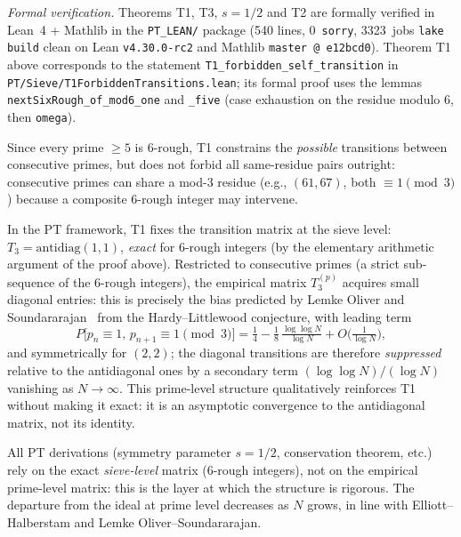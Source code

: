 \documentclass[12pt,a4paper]{article}
\begin{document}
\medskip
\noindent\emph{Formal verification.}
Theorems T1, T3, $s=1/2$ and T2 are formally verified in Lean~4 + Mathlib in
the \texttt{PT\_LEAN/} package (540 lines, 0~\texttt{sorry},
3323~jobs \texttt{lake build} clean on Lean \texttt{v4.30.0-rc2} and
Mathlib \texttt{master @ e12bcd0}). Theorem T1 above corresponds to the
statement \texttt{T1\_forbidden\_self\_transition} in
\texttt{PT/Sieve/T1ForbiddenTransitions.lean}; its formal proof uses the
lemmas \texttt{nextSixRough\_of\_mod6\_one} and \texttt{\_five} (case
exhaustion on the residue modulo 6, then \texttt{omega}).

\begin{corollary}
\label{cor:T1_primes}
Since every prime $\geq 5$ is $6$-rough, T1 constrains the
\emph{possible} transitions between consecutive primes, but does not
forbid all same-residue pairs outright: consecutive primes can share a
mod-$3$ residue (e.g., $(61, 67)$, both $\equiv 1 \pmod{3}$) because a
composite $6$-rough integer may intervene.
\end{corollary}

\begin{remark}
\label{rem:T0_scope}
In the PT framework, T1 fixes the transition matrix at the sieve level:
$T_3 = \mathrm{antidiag}(1,1)$, \emph{exact} for $6$-rough integers
(by the elementary arithmetic argument of the proof above).
Restricted to consecutive primes (a strict sub-sequence of the
$6$-rough integers), the empirical matrix $T_3^{(p)}$ acquires small
diagonal entries: this is precisely the bias predicted by Lemke Oliver
and Soundararajan~\cite{LemkeOliverSoundararajan2016} from the
Hardy--Littlewood conjecture, with leading term
\begin{equation}
  P\bigl[p_n \equiv 1,\, p_{n+1} \equiv 1 \pmod 3\bigr]
   = \tfrac{1}{4} - \tfrac{1}{8}\,\tfrac{\log\log N}{\log N}
     + O\!\bigl(\tfrac{1}{\log N}\bigr),
  \label{eq:LOS_diag}
\end{equation}
and symmetrically for $(2,2)$; the diagonal transitions are therefore
\emph{suppressed} relative to the antidiagonal ones by a secondary
term $(\log\log N)/(\log N)$ vanishing as $N \to \infty$. This
prime-level structure qualitatively reinforces T1 without making it
exact: it is an asymptotic convergence to the antidiagonal matrix,
not its identity.

All PT derivations (symmetry parameter $s = 1/2$, conservation theorem,
etc.) rely on the exact \emph{sieve-level} matrix ($6$-rough integers),
not on the empirical prime-level matrix: this is the layer at which
the structure is rigorous. The departure from the ideal at prime level
decreases as $N$ grows, in line with Elliott--Halberstam and Lemke
Oliver--Soundararajan.
\end{remark}
\end{document}
